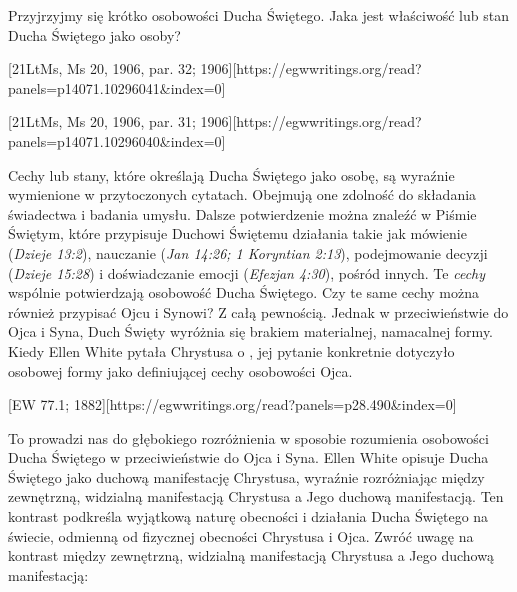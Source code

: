 Przyjrzyjmy się krótko osobowości Ducha Świętego. Jaka jest właściwość lub stan Ducha Świętego jako osoby?

[21LtMs, Ms 20, 1906, par. 32; 1906][https://egwwritings.org/read?panels=p14071.10296041&index=0]

[21LtMs, Ms 20, 1906, par. 31; 1906][https://egwwritings.org/read?panels=p14071.10296040&index=0]

Cechy lub stany, które określają Ducha Świętego jako osobę, są wyraźnie wymienione w przytoczonych cytatach. Obejmują one zdolność do składania świadectwa i badania umysłu. Dalsze potwierdzenie można znaleźć w Piśmie Świętym, które przypisuje Duchowi Świętemu działania takie jak mówienie (\textit{Dzieje 13:2}), nauczanie (\textit{Jan 14:26; 1 Koryntian 2:13}), podejmowanie decyzji (\textit{Dzieje 15:28}) i doświadczanie emocji (\textit{Efezjan 4:30}), pośród innych. Te \textit{cechy} wspólnie potwierdzają osobowość Ducha Świętego. Czy te same cechy można również przypisać Ojcu i Synowi? Z całą pewnością. Jednak w przeciwieństwie do Ojca i Syna, Duch Święty wyróżnia się brakiem materialnej, namacalnej formy. Kiedy Ellen White pytała Chrystusa o , jej pytanie konkretnie dotyczyło osobowej formy jako definiującej cechy osobowości Ojca.

[EW 77.1; 1882][https://egwwritings.org/read?panels=p28.490&index=0]

To prowadzi nas do głębokiego rozróżnienia w sposobie rozumienia osobowości Ducha Świętego w przeciwieństwie do Ojca i Syna. Ellen White opisuje Ducha Świętego jako duchową manifestację Chrystusa, wyraźnie rozróżniając między zewnętrzną, widzialną manifestacją Chrystusa a Jego duchową manifestacją. Ten kontrast podkreśla wyjątkową naturę obecności i działania Ducha Świętego na świecie, odmienną od fizycznej obecności Chrystusa i Ojca. Zwróć uwagę na kontrast między zewnętrzną, widzialną manifestacją Chrystusa a Jego duchową manifestacją:

